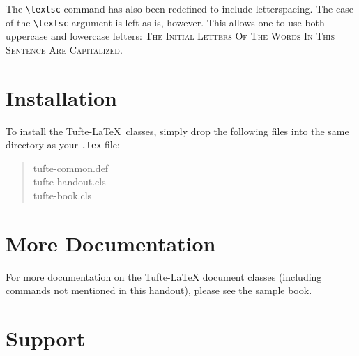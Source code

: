 \documentclass{tufte-handout}
\begin{document}
The \Verb|\textsc| command has also been redefined to include
letterspacing.  The case of the \Verb|\textsc| argument is left as is,
however.  This allows one to use both uppercase and lowercase letters:
\textsc{The Initial Letters Of The Words In This Sentence Are Capitalized.}

\section{Installation}\label{sec:installation}
To install the Tufte-\LaTeX\ classes, simply drop the
following files into the same directory as your \texttt{.tex}
file:
\begin{quote}
  \ttfamily
  tufte-common.def\\
  tufte-handout.cls\\
  tufte-book.cls
\end{quote}




\section{More Documentation}\label{sec:more-doc}
For more documentation on the Tufte-\LaTeX{} document classes (including commands not
mentioned in this handout), please see the sample book.

\section{Support}\label{sec:support}



\end{document}
